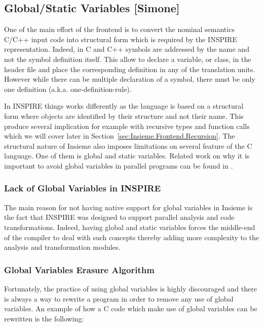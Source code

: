 \subsection{Global/Static Variables [Simone]}
\label{sec:Insieme.Frontend.Global}

One of the main effort of the frontend is to convert the nominal semantics C/C++
input code into structural form which is required by the INSPIRE representation.
Indeed, in C and C++ symbols are addressed by the name and not the symbol
definition itself. This allow to declare a variable, or class, in the header
file and place the corresponding definition in any of the translation units.
However while there can be multiple declaration of a symbol, there must be only
one definition (a.k.a. one-definition-rule). 

In INSPIRE things works differently as the language is based on a structural
form where objects are identified by their structure and not their name. This
produce several implication for example with recursive types and function calls
which we will cover later in Section~\ref{sec:Insieme.Frontend.Recursion}. The
structural nature of Insieme also imposes limitations on several feature of the
C language. One of them is global and static variables. Related work on why it
is important to avoid global variables in parallel programs can be found in
\cite{Zheng:2011:AHG:2117686.2118457}. 

\subsubsection{Lack of Global Variables in INSPIRE}
The main reason for not having native support for global variables in Insieme is
the fact that INSPIRE was designed to support parallel analysis and code
transformations. Indeed, having global and static variables forces the
middle-end of the compiler to deal with such concepts thereby adding more
complexity to the analysis and transformation modules.

\subsubsection{Global Variables Erasure Algorithm}
 Fortunately, the practice of using global variables is highly discouraged and
 there is always a way to rewrite a program in order to remove any use of global
 variables.  An example of how a C code which make use of global variables can
 be rewritten is the following:

